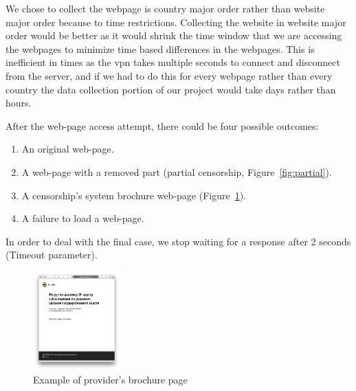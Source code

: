 \documentclass[conference]{IEEEtran}
\begin{document}
We chose to collect the webpage is country major order rather than website major order because to time restrictions. 
Collecting the website in website major order would be better as it would shrink the time window that we are accessing the webpages to minimize time based differences in the webpages. 
This is inefficient in times as the vpn takes multiple seconds to connect and disconnect from the server, and if we had to do this for every webpage rather than every country the data collection portion of our project would take days rather than hours. 

After the web-page access attempt, there could be four possible outcomes:
\begin{enumerate}
    \item An original web-page.
    \item A web-page with a removed part (partial censorship,    Figure~\ref{fig:partial}).
    \item A censorship's system brochure web-page (Figure~\ref{fig:brochure}).
    \item A failure to load a web-page.
\end{enumerate}
In order to deal with the final case, we stop waiting for a response after 2 seconds (Timeout parameter).

\begin{figure}
\centering
\includegraphics[width=0.3\textwidth]{azartplay-kyrgystan.png}
\caption{Example of provider's brochure page}
\label{fig:brochure}
\end{figure}
\end{document}
